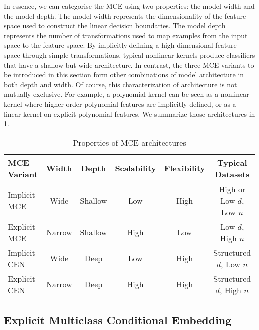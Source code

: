 \documentclass[runningheads, envcountsame, a4paper]{llncs}
\begin{document}
		In essence, we can categorise the \gls{MCE} using two properties: the model width and the model depth. The model width represents the dimensionality of the feature space used to construct the linear decision boundaries. The model depth represents the number of transformations used to map examples from the input space to the feature space. By implicitly defining a high dimensional feature space through simple transformations, typical nonlinear kernels produce classifiers that have a shallow but wide architecture. In contrast, the three \gls{MCE} variants to be introduced in this section form other combinations of model architecture in both depth and width. Of course, this characterization of architecture is not mutually exclusive. For example, a polynomial kernel can be seen as a nonlinear kernel where higher order polynomial features are implicitly defined, or as a linear kernel on explicit polynomial features. We summarize those architectures in \cref{tab:multiclass_conditional_embedding_variants}.
		
		\begin{table}[h]
			\caption{Properties of \gls{MCE} architectures}
			\label{tab:multiclass_conditional_embedding_variants}
			\centering
			\begin{tabular}{lccccc}
				\gls{MCE} Variant & Width & Depth & Scalability & Flexibility & Typical Datasets  \\
				\midrule
				Implicit \gls{MCE} & Wide & Shallow & Low & High & High or Low $d$, Low $n$ \\
				Explicit \gls{MCE} & Narrow & Shallow & High & Low & Low $d$, High $n$ \\
				Implicit \gls{CEN} &  Wide & Deep & Low & High & Structured $d$, Low $n$ \\
				Explicit \gls{CEN} & Narrow & Deep & High & High & Structured $d$, High $n$ \\ 
			\end{tabular}
		\end{table}
	
		\subsection{Explicit Multiclass Conditional Embedding}
		\label{app:explicit_multiclass_conditional_embedding}
	
\end{document}
